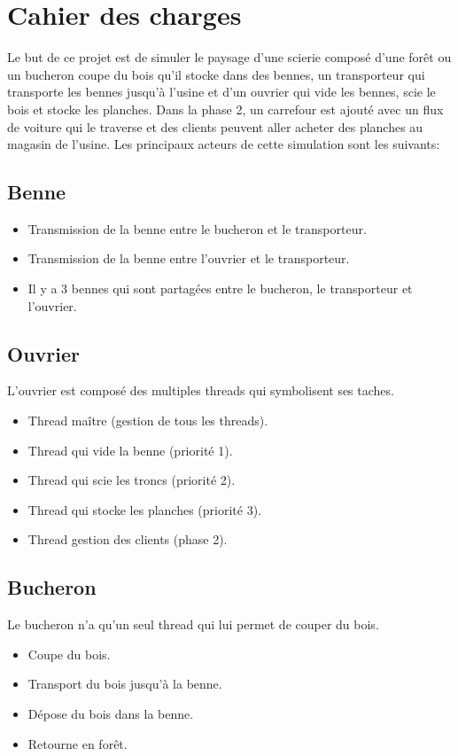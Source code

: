 \documentclass[a4paper, 12pt, oneside]{article}
\begin{document}
    
    \thispagestyle{empty}
    \tableofcontents
    \newpage
    \section{Cahier des charges}
    Le but de ce projet est de simuler le paysage d'une scierie composé d'une forêt ou un bucheron coupe du bois qu'il stocke dans des bennes, un transporteur qui
    transporte les bennes jusqu'à l'usine et d'un ouvrier qui vide les bennes, scie le bois et stocke les planches. Dans la phase 2, un carrefour est ajouté
    avec un flux de voiture qui le traverse et des clients peuvent aller acheter des planches au magasin de l'usine. Les principaux acteurs de cette simulation sont
    les suivants:
        \subsection{Benne}
            \begin{itemize}
                \item Transmission de la benne entre le bucheron et le transporteur.
                \item Transmission de la benne entre l'ouvrier et le transporteur.
                \item Il y a 3 bennes qui sont partagées entre le bucheron, le transporteur et l'ouvrier.
            \end{itemize} 
        \subsection{Ouvrier}
            L'ouvrier est composé des multiples threads qui symbolisent ses taches.
            \begin{itemize}
                \item Thread maître (gestion de tous les threads).
                \item Thread qui vide la benne (priorité 1).
                \item Thread qui scie les troncs (priorité 2).
                \item Thread qui stocke les planches (priorité 3). 
                \item Thread gestion des clients (phase 2).
            \end{itemize}
        \subsection{Bucheron}
            Le bucheron n'a qu'un seul thread qui lui permet de couper du bois.
            \begin{itemize}
                \item Coupe du bois.
                \item Transport du bois jusqu'à la benne.
                \item Dépose du bois dans la benne.
                \item Retourne en forêt.
            \end{itemize}
\end{document}
